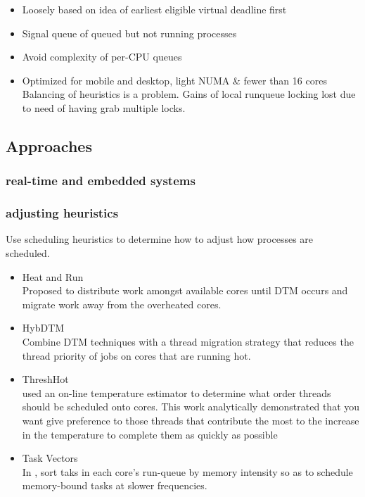 \documentclass[11pt]{article}
\begin{document}
\begin{itemize}
\begin{itemize}
\begin{itemize}
\item Loosely based on idea of earliest eligible virtual deadline first\\
\label{sec-1_2_3_1_4_1}%
\item Signal queue of queued but not running processes\\
\label{sec-1_2_3_1_4_2}%
\item Avoid complexity of per-CPU queues\\
\label{sec-1_2_3_1_4_3}%
\item Optimized for mobile and desktop, light NUMA \& fewer than 16 cores\\
\label{sec-1_2_3_1_4_4}%
Balancing of heuristics is a problem.  Gains of local runqueue locking
lost due to need of having grab multiple locks.
\end{itemize} %
\end{itemize} %
\end{itemize} %
\subsection{Approaches}
\label{sec-1_3}
\subsubsection{real-time and embedded systems}
\label{sec-1_3_1}
\subsubsection{adjusting heuristics}
\label{sec-1_3_2}

Use scheduling heuristics to determine how to adjust how processes are scheduled.
\begin{itemize}

\item Heat and Run\\
\label{sec-1_3_2_1}%
Proposed to distribute work amongst available cores until DTM occurs and
migrate work away from the overheated cores.

\item HybDTM\\
\label{sec-1_3_2_2}%
Combine DTM techniques with a thread migration strategy that reduces the
thread priority of jobs on cores that are running hot.

\item ThreshHot\\
\label{sec-1_3_2_3}%
\cite{Yang2008}\cite{Yang2010} used an on-line temperature estimator to
determine what order threads should be scheduled onto cores. This work
analytically demonstrated that you want give preference to those threads
that contribute the most to the increase in the temperature to complete
them as quickly as possible

\item Task Vectors\\
\label{sec-1_3_2_4}%
In \cite{Merkel2008b}, sort taks in each core's run-queue by memory
intensity so as to schedule memory-bound tasks at slower frequencies.
\end{itemize} %
\end{document}
